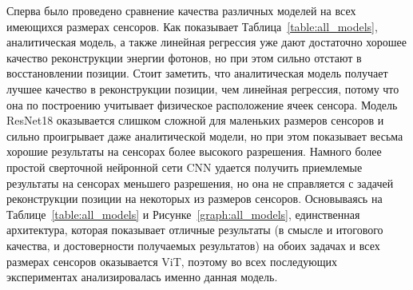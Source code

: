 \documentclass[a4paper,12pt]{extarticle}
\begin{document}
Сперва было проведено сравнение качества различных моделей на всех имеющихся размерах сенсоров. Как показывает Таблица~\ref{table:all_models}, аналитическая модель, а также линейная регрессия уже дают достаточно хорошее качество реконструкции энергии фотонов, но при этом сильно отстают в восстановлении позиции. Стоит заметить, что аналитическая модель получает лучшее качество в реконструкции позиции, чем линейная регрессия, потому что она по построению учитывает физическое расположение ячеек сенсора. Модель \textsf{ResNet18} оказывается слишком сложной для маленьких размеров сенсоров и сильно проигрывает даже аналитической модели, но при этом показывает весьма хорошие результаты на сенсорах более высокого разрешения. Намного более простой сверточной нейронной сети \textsf{CNN} удается получить приемлемые результаты на сенсорах меньшего разрешения, но она не справляется с задачей реконструкции позиции на некоторых из размеров сенсоров. Основываясь на Таблице~\ref{table:all_models} и Рисунке~\ref{graph:all_models}, единственная архитектура, которая показывает отличные результаты (в смысле и итогового качества, и достоверности получаемых результатов) на обоих задачах и всех размерах сенсоров оказывается \textsf{ViT}, поэтому во всех последующих экспериментах анализировалась именно данная модель.
\end{document}
